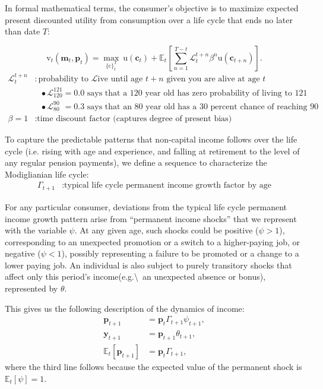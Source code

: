 \documentclass{article}
\newcommand{\uFunc}{\mathrm{u}}
\newcommand{\cLvl}{\mathbf{c}}
\newcommand{\mLvl}{\mathbf{m}}
\newcommand{\yLvl}{\mathbf{y}}
\newcommand{\pLvl}{\mathbf{p}}
\newcommand{\DiscFac}{\beta}
\newcommand{\cFunc}{\mathrm{c}}
\newcommand{\vFunc}{\mathrm{v}}
\newcommand{\Alive}{\mathcal{L}}
\newcommand{\Ex}{\mathbb{E}}
\newcommand{\permGroFac}{\Gamma}
\newcommand{\permShk}{\psi}
\newcommand{\tranShk}{\theta}
\begin{document}
In formal mathematical terms, the consumer's objective is to maximize expected present discounted utility from consumption over a life cycle that ends no later than date $T$:

\begin{equation}
\label{eq:lifecyclemax}
\pmb{\vFunc}_{t}(\mLvl_{t},\pLvl_{t}) = \max_{\{\cFunc\}_{t}^{T}} ~ \uFunc(\cLvl_{t})+\Ex_{t}\left[\sum_{n=1}^{T-t} \Alive_{t}^{t+n}{\DiscFac}^{n} \uFunc(\cLvl_{t+n}) \right].
\end{equation}
\begin{align*}
    \Alive _{t}^{t+n} & : \text{probability to } \Alive \text{ive until age $t+n$ given you are alive at age $t$}
    \\                   & {~~~}\bullet \Alive_{120}^{121} = 0.0 \text{ says that a 120 year old has zero probability of living to 121}
    \\                   & {~~~}\bullet \Alive_{80\phantom{1}}^{90\phantom{1}} = 0.3 \text{ says that an 80 year old has a 30 percent chance of reaching 90}
    \\ \DiscFac = 1        & : \text{time discount factor (captures degree of present bias)}
\end{align*}

To capture the predictable patterns that non-capital income follows over the life cycle (i.e. rising with age and experience, and falling at retirement to the level of any regular pension payments), we define a sequence to characterize the Modiglianian life cycle:
\begin{align}
    \permGroFac_{t+1} & : \text{typical life cycle permanent income growth factor by age}
\end{align}

For any particular consumer, deviations from the typical life cycle permanent income growth pattern arise from ``permanent income shocks'' that we represent with the variable $\permShk$.
At any given age, such shocks could be positive ($\psi>1$), corresponding to an unexpected promotion or a switch to a higher-paying job, or negative ($\psi < 1$), possibly representing a failure to be promoted or a change to a lower paying job.
An individual is also subject to purely transitory shocks that affect only this period's income(e.g.{\textbackslash}~an unexpected absence or bonus), represented by $\tranShk$.

This gives us the following description of the dynamics of income:
\begin{align}
    \pLvl_{t+1} & = \pLvl_{t} \permGroFac_{t+1} \permShk_{t+1}, \\
    \yLvl_{t+1} & = \pLvl_{t+1} \tranShk_{t+1}, \\
    \Ex_{t}[\pLvl_{t+1}] & = \pLvl_{t} \permGroFac_{t+1},
\end{align}
where the third line follows because the expected value of the permanent shock is $\Ex_{t}[\permShk]=1$.
\end{document}
